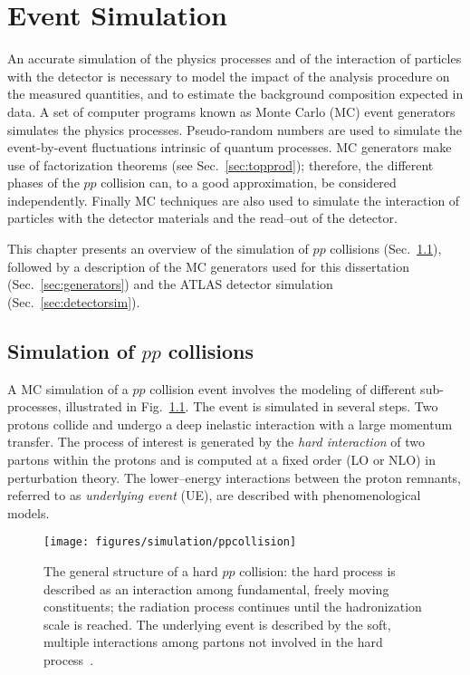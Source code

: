\chapter{Event Simulation}
\label{sec:simulation}

An accurate simulation of the physics processes and of the interaction
of particles with the detector is necessary to model the impact of the
analysis procedure on the measured quantities, and to estimate the
background composition expected in data. A set of computer programs
known as Monte Carlo (MC) event generators simulates the physics
processes.
Pseudo-random numbers are used to simulate the event-by-event
fluctuations intrinsic of quantum processes. MC generators make use of
factorization theorems (see Sec.~\ref{sec:topprod}); therefore, the
different phases of the $pp$ collision can, to a good approximation,
be considered independently. 
Finally MC techniques are also used to simulate the interaction of
particles with the detector materials and the read--out of the
detector.

This chapter presents an overview of the simulation of $pp$
collisions (Sec.~\ref{sec:MCsimulation}), followed by a description of
the MC generators used for this dissertation
(Sec.~\ref{sec:generators}) and the ATLAS detector simulation
(Sec.~\ref{sec:detectorsim}).

\section{Simulation of $pp$ collisions}
\label{sec:MCsimulation}

A MC simulation of a $pp$ collision event involves the
modeling of different sub-processes, illustrated in
Fig.~\ref{fig:collision}.
The event is simulated in several steps. Two protons collide and
undergo a deep inelastic interaction with a large momentum transfer.
The process of interest is generated by the {\it hard interaction} of
two partons within the protons and is computed at a fixed order (LO
or NLO) in perturbation theory. 
The lower--energy interactions between the proton remnants,
referred to as {\it underlying event} (UE), are described with
phenomenological models.

\begin{figure}[ht]
  \begin{center}
    \texttt{[image: figures/simulation/ppcollision]}
    \caption{
      The general structure of a hard $pp$ collision: the hard process
      is described as an interaction among fundamental, freely moving
      constituents; the radiation process continues until the
      hadronization scale is reached. The underlying event is
      described by the soft, multiple interactions among partons not
      involved in the hard process~\cite{mangano2005}.}
    \label{fig:collision}
  \end{center}
\end{figure}

